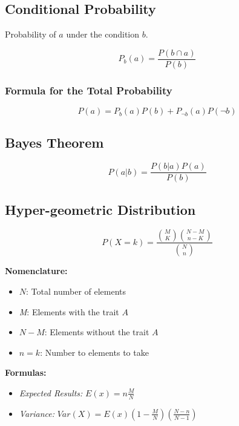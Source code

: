 \subsection{Conditional Probability}

Probability of \(a\) under the condition \(b\).

\[
    P_b (a) = \frac{P(b \cap a)}{P(b)}
\]

\subsubsection{Formula for the Total Probability}

\[
    P(a) = P_b (a) P(b) + P_{\neg b}(a) P(\neg b)
\]

\subsection{Bayes Theorem}

\[
    P(a | b) = \frac{P(b | a) P(a)}{P(b)}
\]

\subsection{Hyper-geometric Distribution}

\[
    P(X = k) = \frac{\binom{M}{K} \binom{N - M}{n - K}}{\binom{N}{n}}
\]

\textbf{Nomenclature:}

\begin{itemize}

    \item \(N\): Total number of elements

    \item \emph{M}: Elements with the trait \(A\)

    \item \(N - M\): Elements without the trait \(A\)

    \item \(n = k\): Number to elements to take

\end{itemize}

\textbf{Formulas:}

\begin{itemize}

    \item \emph{Expected Results: } \(E(x) = n \frac{M}{N}\)

    \item \emph{Variance: } \(Var(X) = E(x)\left(1 - \frac{M}{N}\right) \left(\frac{N - n}{N - 1}\right)\)

\end{itemize}

